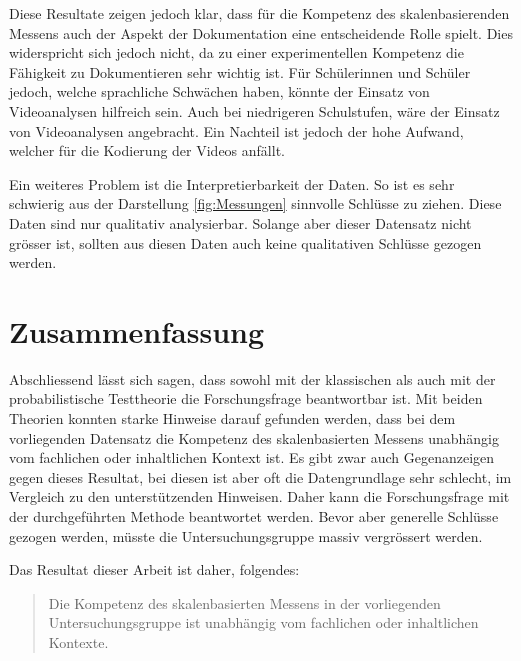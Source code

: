 Diese Resultate zeigen jedoch klar, dass für die Kompetenz des skalenbasierenden Messens auch der Aspekt der Dokumentation eine entscheidende Rolle spielt. Dies widerspricht sich jedoch nicht, da zu einer experimentellen Kompetenz die Fähigkeit zu Dokumentieren sehr wichtig ist. Für Schülerinnen und Schüler jedoch, welche sprachliche Schwächen haben, könnte der Einsatz von Videoanalysen hilfreich sein. Auch bei niedrigeren Schulstufen, wäre der Einsatz von Videoanalysen angebracht. Ein Nachteil ist jedoch der hohe Aufwand, welcher für die Kodierung der Videos anfällt. 

Ein weiteres Problem ist die Interpretierbarkeit der Daten. So ist es sehr schwierig aus der Darstellung \ref{fig:Messungen} sinnvolle Schlüsse zu ziehen. Diese Daten sind nur qualitativ analysierbar. Solange aber dieser Datensatz nicht grösser ist, sollten aus diesen Daten auch keine qualitativen Schlüsse gezogen werden.

\section{Zusammenfassung}

Abschliessend lässt sich sagen, dass sowohl mit der klassischen als auch mit der probabilistische Testtheorie die Forschungsfrage beantwortbar ist. Mit beiden Theorien konnten starke Hinweise darauf gefunden werden, dass bei dem vorliegenden Datensatz die Kompetenz des skalenbasierten Messens unabhängig vom fachlichen oder inhaltlichen Kontext ist. Es gibt zwar auch Gegenanzeigen gegen dieses Resultat, bei diesen ist aber oft die Datengrundlage sehr schlecht, im Vergleich zu den unterstützenden Hinweisen. Daher kann die Forschungsfrage mit der durchgeführten Methode beantwortet werden. Bevor aber generelle Schlüsse gezogen werden, müsste die Untersuchungsgruppe massiv vergrössert werden. 

Das Resultat dieser Arbeit ist daher, folgendes:
\begin{quote}
 Die Kompetenz des skalenbasierten Messens in der vorliegenden Untersuchungsgruppe ist unabhängig vom fachlichen oder inhaltlichen Kontexte.
\end{quote}


